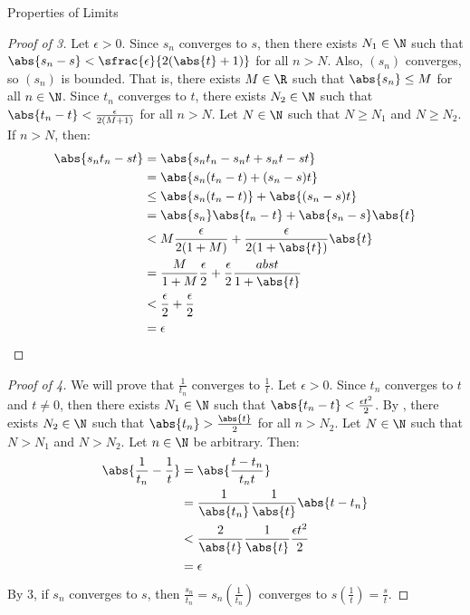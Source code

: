 \begin{thmbox}{Properties of Limits}{}
    \begin{proof}[Proof of 3]
        Let $\epsilon > 0$. Since $s_n$ converges to $s$, then there exists $N_1 \in \N$ such that $\abs{s_n - s} < \sfrac{\epsilon}{2(\abs{t} + 1)}$ for all $n > N$. Also, $(s_n)$ converges, so $(s_n)$ is bounded. That is, there exists $M \in \R$ such that $\abs{s_n} \leq M$ for all $n \in \N$. Since $t_n$ converges to $t$, there exists $N_2 \in \N$ such that $\abs{t_n - t} < \frac{\epsilon}{2(M+1)}$ for all $n > N$. Let $N \in \N$ such that $N \geq N_1$ and $N \geq N_2$. If $n > N$, then:
        \begin{align*}
            \abs{s_nt_n - st}
            &= \abs{s_nt_n - s_nt + s_nt - st} \\
            &= \abs{s_n(t_n-t) + (s_n-s)t} \\
            &\leq \abs{s_n(t_n-t)} + \abs{(s_n-s)t} \\
            &= \abs{s_n} \abs{t_n-t} + \abs{s_n-s}\abs{t} \\
            &< M \frac{\epsilon}{2(1+M)} + \frac{\epsilon}{2(1+\abs{t})} \abs{t} \\
            &= \frac{M}{1+M} \frac{\epsilon}{2} + \frac{\epsilon}{2} \frac{abs{t}}{1 + \abs{t}} \\
            &< \frac{\epsilon}{2} + \frac{\epsilon}{2} \\
            &= \epsilon
        \end{align*}
    \end{proof}

    \begin{proof}[Proof of 4]
        We will prove that $\frac{1}{t_n}$ converges to $\frac{1}{t}$. Let $\epsilon > 0$. Since $t_n$ converges to $t$ and $t \neq 0$, then there exists $N_1 \in \N$ such that $\abs{t_n - t} < \frac{\epsilon t^2}{2}$. By , there exists $N_2 \in \N$ such that $\abs{t_n} > \frac{\abs{t}}{2}$ for all $n > N_2$. Let $N \in \N$ such that $N > N_1$ and $N > N_2$. Let $n \in \N$ be arbitrary. Then:
        \begin{align*}
            \abs{\frac{1}{t_n} - \frac{1}{t}} &= \abs{\frac{t-t_n}{t_nt}} \\
            &= \frac{1}{\abs{t_n}} \frac{1}{\abs{t}} \abs{t-t_n} \\
            &< \frac{2}{\abs{t}} \frac{1}{\abs{t}} \frac{\epsilon t^2}{2} \\
            &= \epsilon
        \end{align*}
        By 3, if $s_n$ converges to $s$, then $\frac{s_n}{t_n} = s_n \left( \frac{1}{t_n} \right) $ converges to $s \left( \frac{1}{t} \right) = \frac{s}{t}$.
    \end{proof}
\end{thmbox}

